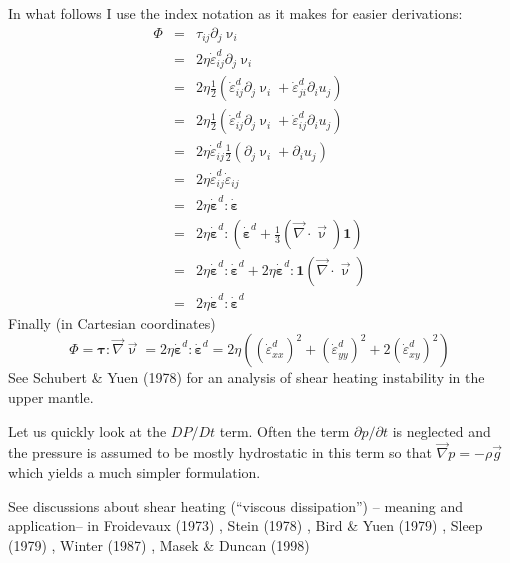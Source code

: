 In what follows I use the index notation as it makes for easier derivations:
\begin{eqnarray}
\Phi 
&=& \tau_{ij}\partial_j \upnu_i \nonumber\\
&=& 2 \eta \dot{\varepsilon}_{ij}^d\partial_j \upnu_i \nonumber\\
&=& 2 \eta \frac{1}{2}\left( \dot{\varepsilon}_{ij}^d\partial_j \upnu_i + \dot{\varepsilon}_{ji}^d\partial_i u_j \right) \nonumber\\
&=& 2 \eta \frac{1}{2}\left( \dot{\varepsilon}_{ij}^d\partial_j \upnu_i + \dot{\varepsilon}_{ij}^d\partial_i u_j \right) \nonumber\\
&=& 2 \eta  \dot{\varepsilon}_{ij}^d  \frac{1}{2}\left(\partial_j \upnu_i + \partial_i u_j \right) \nonumber\\
&=& 2 \eta  \dot{\varepsilon}_{ij}^d   \dot{\varepsilon}_{ij} \nonumber\\
&=& 2 \eta  \dot{\bm \varepsilon}^d :  \dot{\bm \varepsilon} \nonumber\\
&=& 2 \eta  \dot{\bm \varepsilon}^d : \left( \dot{\bm \varepsilon}^d +\frac{1}{3} ({\vec \nabla}\cdot{\vec \upnu}) {\bm 1} \right)\nonumber\\
&=& 2 \eta  \dot{\bm \varepsilon}^d : \dot{\bm \varepsilon}^d 
+ 2 \eta  \dot{\bm \varepsilon}^d : {\bm 1} ({\vec \nabla}\cdot{\vec \upnu}) \nonumber\\ 
&=& 2 \eta  \dot{\bm \varepsilon}^d : \dot{\bm \varepsilon}^d \label{eq:physicsshearheating} 
\end{eqnarray}
Finally (in Cartesian coordinates)
\begin{equation}
\Phi = {\bm \tau}:{\vec \nabla}{\vec \upnu} = 2 \eta  \dot{\bm \varepsilon}^d : \dot{\bm \varepsilon}^d
= 2 \eta \left( (\dot{\varepsilon}_{xx}^d)^2 + (\dot{\varepsilon}_{yy}^d)^2 + 2(\dot{\varepsilon}_{xy}^d)^2 \right) 
\end{equation}
See Schubert \& Yuen (1978) \cite{scyu78} for an analysis of shear heating instability in the upper mantle.

Let us quickly look at the $DP/Dt$ term. Often the term $\partial p/\partial t$
is neglected and the pressure is assumed to be mostly hydrostatic in this term so 
that $\vec\nabla p = - \rho \vec{g}$ which yields a much simpler formulation. 


See discussions about shear heating (``viscous dissipation'') -- meaning and application-- in 
Froidevaux (1973) \cite{froi73},
Stein (1978) \cite{stei78},
Bird \& Yuen (1979) \cite{biyu79},
Sleep \etal (1979) \cite{slsg79},
Winter (1987) \cite{wint87},
Masek \& Duncan (1998) \cite{madu98}

